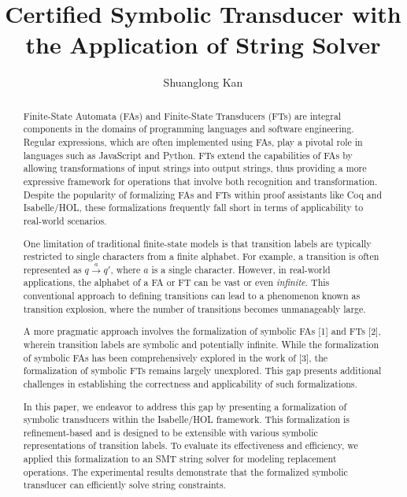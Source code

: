 \documentclass[a4paper,UKenglish,cleveref, autoref, thm-restate]{lipics-v2021}
\title{Certified Symbolic Transducer with the Application of String Solver} %
\author{Shuanglong Kan}{Barkhausen Institut, Germany \and \url{https://github.com/ShlKan} }{shuanglongkan@gmail.com}{https://orcid.org/0000-0002-1825-0097}{(Optional) author-specific funding acknowledgements}%
\begin{document}
\maketitle

\begin{abstract}
Finite-State Automata (FAs) and Finite-State Transducers (FTs) are integral components in the domains of programming languages and software engineering. Regular expressions, which are often implemented using FAs, play a pivotal role in languages such as JavaScript and Python. FTs extend the capabilities of FAs by allowing transformations of input strings into output strings, thus providing a more expressive framework for operations that involve both recognition and transformation. Despite the popularity of formalizing FAs and FTs within proof assistants like Coq and Isabelle/HOL, these formalizations frequently fall short in terms of applicability to real-world scenarios.

One limitation of traditional finite-state models is that transition labels are typically restricted to single characters from a finite alphabet. For example, a transition is often represented as $q \xrightarrow{a} q'$, where $a$ is a single character. However, in real-world applications, the alphabet of a FA or FT can be vast or even \emph{infinite}. This conventional approach to defining transitions can lead to a phenomenon known as transition explosion, where the number of transitions becomes unmanageably large.


A more pragmatic approach involves the formalization of symbolic FAs [1] and FTs [2], wherein transition labels are symbolic and potentially infinite. While the formalization of symbolic FAs has been comprehensively explored in the work of [3], the formalization of symbolic FTs remains largely unexplored. This gap presents additional challenges in establishing the correctness and applicability of such formalizations.

In this paper, we endeavor to address this gap by presenting a formalization of symbolic transducers within the Isabelle/HOL framework. This formalization is refinement-based and is designed to be extensible with various symbolic representations of transition labels. To evaluate its effectiveness and efficiency, we applied this formalization to an SMT string solver for modeling replacement operations. The experimental results demonstrate that the formalized symbolic transducer can efficiently solve string constraints.


\end{abstract}
\end{document}
